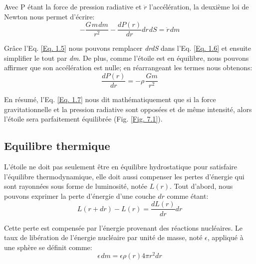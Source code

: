 Avec P étant la force de pression radiative et $\ddot{r}$ l'accélération, la deuxième loi de Newton nous permet
d'écrire\footnotemark[3]:\begin{equation}-\dfrac{G\hspace{1pt}m\hspace{1pt}dm}{r^{2}}-\dfrac{dP(r)}{dr}dr\hspace{1pt}dS=\ddot r\hspace{1pt}dm\label{Eq. 1.6}\end{equation}

Grâce l'Eq. \ref{Eq. 1.5} nous pouvons remplacer \textit{dr\hspace{1pt}dS} dans l'Eq. \ref{Eq. 1.6} et ensuite simplifier le tout par \textit{dm}. De plus, comme l'étoile est en équilibre, nous pouvons affirmer que son accélération est nulle; en réarrangeant les termes nous obtenons:\begin{equation}\boxed{\dfrac{dP(r)}{dr}=-\rho\hspace{2pt}\frac{Gm}{r^{2}}}\label{Eq. 1.7}\end{equation}

En résumé, l'Eq. \ref{Eq. 1.7} nous dit mathématiquement que si la force gravitationnelle et la pression radiative sont opposées et de même intensité, alors l'étoile sera parfaitement équilibrée (Fig. \ref{Fig. 7.1}).


\subsection{Equilibre thermique}\label{1.1.3}

L'étoile ne doit pas seulement être en équilibre hydrostatique pour satisfaire l'équilibre thermodynamique, elle doit aussi compenser les pertes d'énergie qui sont rayonnées sous forme de luminosité, notée $L(r)$. Tout d'abord, nous pouvons exprimer la perte d'énergie d'une couche $dr$ comme étant:\begin{equation}L(r+dr)-L(r)=\dfrac{dL(r)}{dr}dr\label{Eq. 1.8}\end{equation}

Cette perte est compensée par l'énergie provenant des réactions nucléaires. Le taux de libération de l'énergie nucléaire par unité de masse, noté $\epsilon$, appliqué à une sphère se définit comme:\begin{equation}\epsilon\hspace{1pt}dm=\epsilon\rho(r)4\pi r^{2}dr\label{Eq. 1.9}\end{equation}

